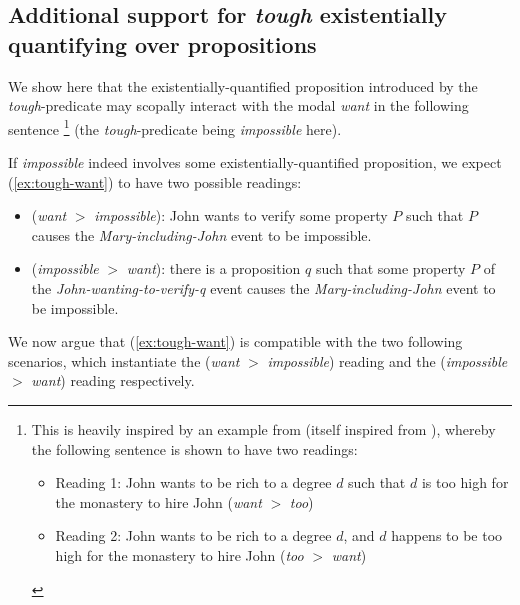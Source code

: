 \documentclass[11pt]{article}
\begin{document}
	\subsection{Additional support for \textit{tough} existentially quantifying over propositions}\label{app:tough-scope}
	We show here that the existentially-quantified proposition introduced by the \textit{tough}-predicate may scopally interact with the modal \textit{want} in the following sentence
	\footnote{This is heavily inspired by an example from \cite{Nissenbaum2011} (itself inspired from \cite{Heim2000}), whereby the following sentence is shown to have two readings:
		\begin{exe}
		\end{exe}
		\begin{itemize}
			\item Reading 1: John wants to be rich to a degree $d$ such that $d$ is too high for the monastery to hire John (\textit{want} $>$ \textit{too})
			\item Reading 2: John wants to be rich to a degree $d$, and $d$ happens to be too high for the monastery to hire John (\textit{too} $>$ \textit{want})
	\end{itemize}} (the \textit{tough}-predicate being \textit{impossible} here).
	\begin{exe}
		\label{ex:tough-want}
	\end{exe}
	 If \textit{impossible} indeed involves some existentially-quantified proposition, we expect (\ref{ex:tough-want}) to have two possible readings:
	\begin{itemize}
		\item (\textit{want} $>$ \textit{impossible}): John wants to verify some property $P$ such that $P$ causes the \textit{Mary-including-John} event to be impossible.
		\item (\textit{impossible} $>$ \textit{want}): there is a proposition $q$ such that some property $P$ of the \textit{John-wanting-to-verify-q} event causes the \textit{Mary-including-John} event to be impossible.
	\end{itemize}
	 We now argue that (\ref{ex:tough-want}) is compatible with the two following scenarios, which instantiate the (\textit{want} $>$ \textit{impossible}) reading and the (\textit{impossible} $>$ \textit{want}) reading respectively.
\end{document}
